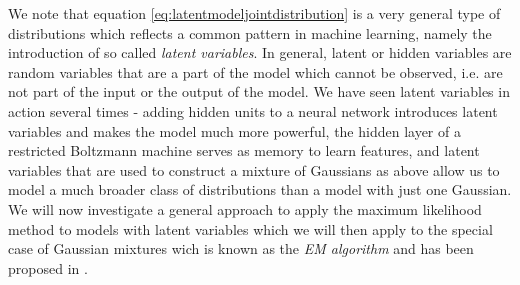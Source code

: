 \documentclass[a4paper, draft]{article}
\theoremstyle{own}
\theoremstyle{remark}
\begin{document}
We note that equation \ref{eq:latentmodeljointdistribution} is a very general type of distributions which reflects a common pattern in machine learning, namely the introduction of so called {\em latent variables}. In general, latent or hidden variables are random variables that are a part of the model which cannot be observed, i.e. are not part of the input or the output of the model. We have seen latent variables in action several times - adding hidden units to a neural network introduces latent variables and makes the model much more powerful, the hidden layer of a restricted Boltzmann machine serves as memory to learn features, and latent variables that are used to construct a mixture of Gaussians as above allow us to model a much broader class of distributions than a model with just one Gaussian. We will now investigate a general approach to apply the maximum likelihood method to models with latent variables which we will then apply to the special case of Gaussian mixtures wich is known as the {\em EM algorithm} and has been proposed in \cite{Dempster77}.
\end{document}
